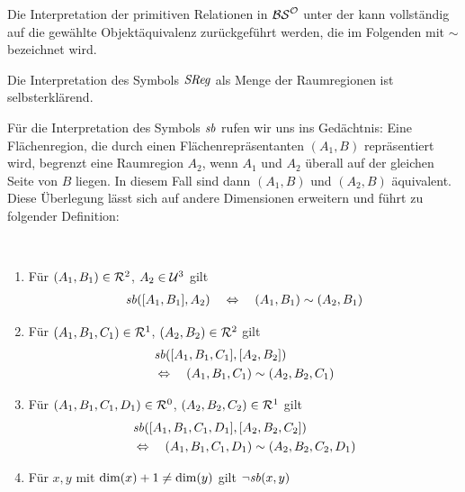         Die Interpretation der primitiven Relationen in $\mathcal{BS}^{\mathcal{O}}$ unter der \strukt kann vollständig auf die gewählte Objektäquivalenz zurückgeführt werden, die im Folgenden mit $\sim$ bezeichnet wird.

        Die Interpretation des Symbols $\GSReg$ als Menge der Raumregionen ist selbsterklärend.
        \marginpar{$\GSReg$}

        Für die Interpretation des Symbols $\mathit{sb}$ rufen wir uns ins Gedächtnis:
        Eine Flächenregion, die durch einen Flächenrepräsentanten $(A_1,B)$ repräsentiert wird, begrenzt eine Raumregion $A_2$, wenn $A_1$ und $A_2$ überall auf der gleichen Seite von $B$ liegen. In diesem Fall sind dann $(A_1,B)$ und $(A_2, B)$ äquivalent.
        Diese Überlegung lässt sich auf andere Dimensionen erweitern und führt zu folgender Definition:

        \begin{dfn}\ \vspace{0pt}

            \begin{enumerate}
                \item Für $(A_1,B_1) \in \mathcal{R}^2$, $A_2 \in \mathcal{U}^3$ gilt 
                    \begin{align*}
                        \mathit{sb}([A_1,B_1],A_2) \quad \Leftrightarrow \quad (A_1,B_1) \sim (A_2,B_1)
                    \end{align*}
                \item Für $(A_1,B_1,C_1) \in \mathcal{R}^1$, $(A_2,B_2) \in \mathcal{R}^2$ gilt 
                    \begin{align*}
                        &\mathit{sb}([A_1,B_1,C_1],[A_2,B_2]) \quad \\
                        &\Leftrightarrow  \quad (A_1,B_1,C_1) \sim (A_2,B_2,C_1)
                    \end{align*}
                \item Für $(A_1,B_1,C_1,D_1) \in \mathcal{R}^0$, $(A_2,B_2,C_2) \in \mathcal{R}^1$ gilt 
                    \begin{align*}
                        &\mathit{sb}([A_1,B_1,C_1,D_1],[A_2,B_2,C_2]) \quad \\
                        &\Leftrightarrow  \quad (A_1,B_1,C_1,D_1) \sim (A_2,B_2,C_2,D_1)
                    \end{align*}
                \item Für $x, y$ mit $\text{dim}(x) + 1 \neq \text{dim}(y)$ gilt $\neg \mathit{sb}(x,y)$
            \end{enumerate}
            
        \end{dfn}
        

